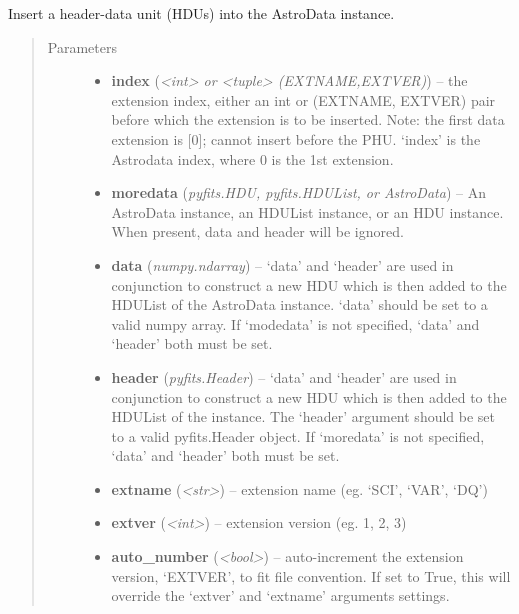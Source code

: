 \documentclass[letterpaper,10pt,english]{sphinxmanual}
\begin{document}
\begin{fulllineitems}
\begin{fulllineitems}
\label{astro_class:astrodata.AstroData.AstroData.insert}
Insert a header-data unit (HDUs) into the AstroData instance.
\begin{quote}\begin{description}
\item[{Parameters}] \leavevmode\begin{itemize}
\item {} 
\textbf{index} (\emph{\textless{}int\textgreater{} or \textless{}tuple\textgreater{} (EXTNAME,EXTVER)}) -- the extension index, either an int or (EXTNAME, EXTVER)
pair before which the extension is to be inserted.
Note: the first data extension is {[}0{]}; cannot insert
before the PHU. `index' is the  Astrodata index, where
0 is the 1st extension.

\item {} 
\textbf{moredata} (\emph{pyfits.HDU, pyfits.HDUList, or AstroData}) -- An AstroData instance, an HDUList instance, or
an HDU instance. When present, data and header will be
ignored.

\item {} 
\textbf{data} (\emph{numpy.ndarray}) -- `data' and `header' are used in conjunction to construct a
new HDU which is then added to the HDUList of the AstroData
instance. `data' should be set to a valid numpy array. 
If `modedata' is not specified, `data' and `header' both
must be set.

\item {} 
\textbf{header} (\emph{pyfits.Header}) -- `data' and `header' are used in conjunction to construct
a new HDU which is then added to the HDUList of the
instance. The `header' argument should be set to a valid
pyfits.Header object. If `moredata' is not specified,
`data' and `header' both must be set.

\item {} 
\textbf{extname} (\emph{\textless{}str\textgreater{}}) -- extension name (eg. `SCI', `VAR', `DQ')

\item {} 
\textbf{extver} (\emph{\textless{}int\textgreater{}}) -- extension version (eg. 1, 2, 3)

\item {} 
\textbf{auto\_number} (\emph{\textless{}bool\textgreater{}}) -- auto-increment the extension version, `EXTVER',
to fit file convention. If set to True, this will
override the `extver' and `extname' arguments
settings.


\end{itemize}
\end{description}
\end{quote}
\end{fulllineitems}
\end{fulllineitems}
\end{document}

